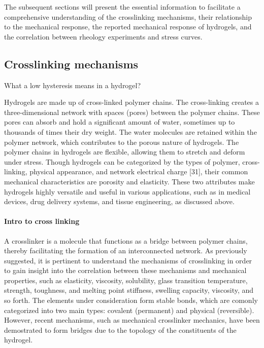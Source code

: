 The subsequent sections will present the essential information to facilitate a comprehensive understanding of the crosslinking mechanisms, their relationship to the mechanical response, the reported mechanical response of hydrogels, and the correlation between rheology experiments and stress curves.

\subsection{Crosslinking mechanisms}\label{ch1:Cross-linking}

What a low hysteresis means in a hydrogel?

Hydrogels are made up of cross-linked polymer chains. 
The cross-linking creates a three-dimensional network with spaces (pores) between the polymer chains.  
These pores can absorb and hold a significant amount of water, sometimes up to  thousands of times their dry weight. 
The water molecules are retained within the  polymer network, which contributes to the porous nature of hydrogels. 
The polymer chains in hydrogels are flexible, allowing them to stretch and deform under  stress. 
Though hydrogels can be categorized by the types of polymer, cross-linking,  physical appearance, and network electrical charge [31], their common mechanical characteristics are porosity and elasticity. 
These two attributes make hydrogels  highly versatile and useful in various applications, such as in medical devices, drug  delivery systems, and tissue engineering, as discussed above.


\paragraph{Intro to cross linking}
A crosslinker is a molecule that functions as a bridge between polymer chains, thereby facilitating the formation of an interconnected network.
As previously suggested, it is pertinent to understand the mechanisms of crosslinking in order to gain insight into the correlation between these mechanisms and mechanical properties, such as elasticity, viscosity, solubility, glass transition temperature, strength, toughness, and melting point stiffness, swelling capacity, viscosity, and so forth\citep{priyaComprehensiveReviewHydrogel2024}.
The elements under consideration form stable bonds, which are comonly categorized into two main types: covalent (permanent) and physical (reversible)\citep{bustamantetorresHydrogelsClassificationAccording2021}.
However, recent mechanisms, such as mechanical crosslinker mechanics, have been demostrated to form bridges due to the topology of the constituents of the hydrogel.

